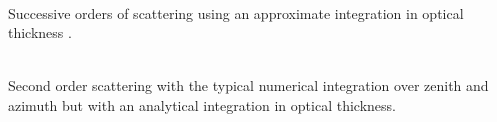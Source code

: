 \begin{description}
\item[\source{XRTM\_SOLVER\_SOS}] \hfill \\
Successive orders of scattering using an approximate integration in optical thickness \citep{fymat_a_l_1974a, min_qilong_2004b, lenoble_j_2007}.

\item[\source{XRTM\_SOLVER\_TWO\_OS}] \hfill \\
Second order scattering with the typical numerical integration over zenith and azimuth but with an analytical integration in optical thickness.
\citep{kawabata_kiyoshi_1988, natraj_vijay_2007a}

\end{description}


%
\label{xrtm_c_interface_configuration_constants_brdf_kernels}

\citep{spurr_r_j_d_2004}

